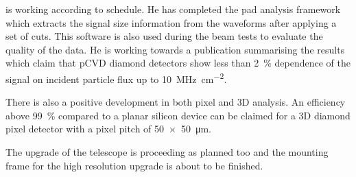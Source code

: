 \me is working according to schedule. He has completed the pad analysis framework which extracts the signal size information from the waveforms after applying a set of cuts. This software is also used during the beam tests to evaluate the quality of the data. He is working towards a publication summarising the results which claim that \ac{pCVD} diamond detectors show less than \SI{2}{\%} dependence of the signal on incident particle flux up to \SI{10}{\mega\hertz\per\centi\meter^2}.\par
There is also a positive development in both pixel and 3D analysis. An efficiency above \SI{99}{\%} compared to a planar silicon device can be claimed for a 3D diamond pixel detector with a pixel pitch of \SI{50x50}{\micro\meter}.\par 
The upgrade of the telescope is proceeding as planned too and the mounting frame for the high resolution upgrade is about to be finished. \parend